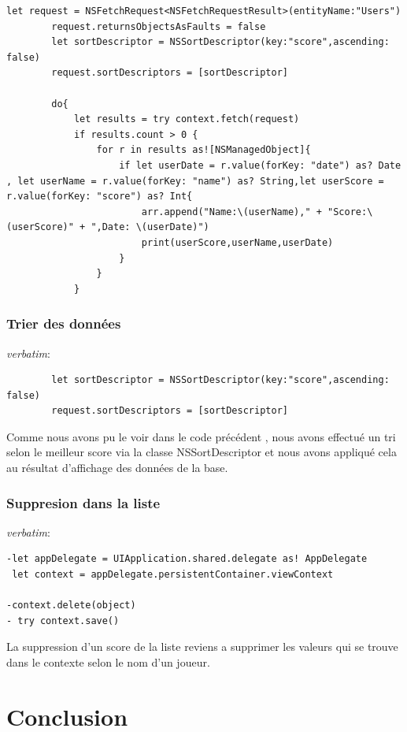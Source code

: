 \documentclass{article}
\begin{document}
\begin{verbatim}
let request = NSFetchRequest<NSFetchRequestResult>(entityName:"Users")
        request.returnsObjectsAsFaults = false
        let sortDescriptor = NSSortDescriptor(key:"score",ascending: false)
        request.sortDescriptors = [sortDescriptor]
        
        do{
            let results = try context.fetch(request)
            if results.count > 0 {
                for r in results as![NSManagedObject]{
                    if let userDate = r.value(forKey: "date") as? Date , let userName = r.value(forKey: "name") as? String,let userScore = r.value(forKey: "score") as? Int{
                        arr.append("Name:\(userName)," + "Score:\(userScore)" + ",Date: \(userDate)")
                        print(userScore,userName,userDate)
                    }
                }
            }
\end{verbatim}

\subsubsection{Trier des données}
\textit{verbatim}:
\begin{verbatim}
        let sortDescriptor = NSSortDescriptor(key:"score",ascending: false)
        request.sortDescriptors = [sortDescriptor]
\end{verbatim}

Comme nous avons pu le voir dans le code précédent , nous avons effectué un tri selon le meilleur score via  la classe  NSSortDescriptor et nous avons appliqué cela au résultat d'affichage des données de la base.

\subsubsection{Suppresion dans la liste}
\textit{verbatim}:
\begin{verbatim}
-let appDelegate = UIApplication.shared.delegate as! AppDelegate     
 let context = appDelegate.persistentContainer.viewContext

-context.delete(object)
- try context.save()
\end{verbatim}

La suppression d'un score de la liste reviens a supprimer les valeurs qui se trouve dans le contexte  selon le nom d'un joueur.

\section{Conclusion}
\end{document}
